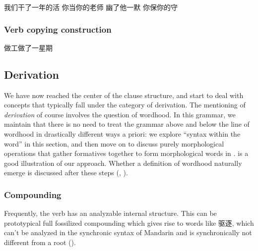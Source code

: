 \documentclass[UTF8, a4paper, oneside, scheme=plain, 12pt]{ctexrep}
\newcommand*{\term}[1]{\emph{#1}}
\begin{document}
\begin{exe}
    \ex\label{ex:grammatical.clause.core-vp.pseudo-attributive.numeral} 我们干了一年的活
    \ex\label{ex:grammatical.clause.core-vp.pseudo-attributive.possessive} 你当你的老师
    \ex\label{ex:grammatical.clause.core-vp.pseudo-attributive.numeral.incorporation} 幽了他一默
    \ex\label{ex:grammatical.clause.core-vp.pseudo-attributive.possessive.incorporation} 你保你的守
\end{exe}

\subsubsection{Verb copying construction}

\begin{exe}
    \ex 做工做了一星期
\end{exe}

\subsection{Derivation}\label{sec:grammatical.clause.core-vp.derivation}

We have now reached the center of the clause structure,
and start to deal with concepts that typically fall under the category of derivation.
The mentioning of \term{derivation} of course involves the question of wordhood.
In this grammar, we maintain that there is no need to treat the grammar above and below the line of wordhood
in drastically different ways a priori: we explore ``syntax within the word'' in this section,
and then move on to discuss purely morphological operations that gather formatives together to form morphological words in .
 is a good illustration of our approach.
Whether a definition of wordhood naturally emerge is discussed after these steps
(, ).

\subsubsection{Compounding}\label{sec:grammatical.clause.core-vp.derivation.compounding}

Frequently, the verb has an analyzable internal structure.
This can be prototypical full fossilized compounding which gives rise to words like 驱逐,
which can't be analyzed in the synchronic syntax of Mandarin
and is synchronically not different from a root
().
\end{document}
